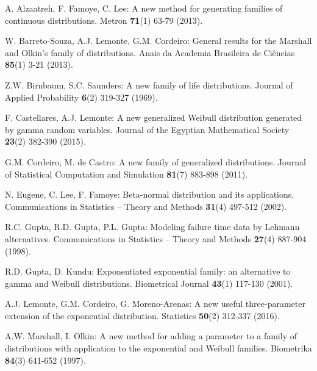 \documentclass[12pt,a4paper]{article} %
\begin{document}
\begin{description}

\item
A. Alzaatreh, F. Famoye, C. Lee:
A new method for generating families of continuous distributions.
Metron {\bf 71}(1) 63-79 (2013).

\item
W. Barreto-Souza, A.J. Lemonte, G.M. Cordeiro:
General results for the Marshall and Olkin's family of distributions.
Anais da Academia Brasileira de Ci\^{e}ncias {\bf 85}(1) 3-21 (2013).

\item
Z.W. Birnbaum, S.C. Saunders:
A new family of life distributions.
Journal of Applied Probability {\bf 6}(2) 319-327 (1969).

\item
F. Castellares, A.J. Lemonte:
A new generalized Weibull distribution gene\-rated by gamma random variables.
Journal of the Egyptian Mathematical Society {\bf 23}(2) 382-390 (2015).

\item
G.M. Cordeiro, M. de Castro:
A new family of generalized distributions.
Journal of Statistical Computation and Simulation {\bf 81}(7) 883-898 (2011).

\item
N. Eugene, C. Lee, F. Famoye:
Beta-normal distribution and its applications.
Communications in Statistics -- Theory and Methods {\bf 31}(4) 497-512 (2002).

\item
R.C. Gupta, R.D. Gupta, P.L. Gupta:
Modeling failure time data by Lehmann alternatives.
Communications in Statistics -- Theory and Methods {\bf 27}(4) 887-904 (1998).

\item
R.D. Gupta, D. Kundu:
Exponentiated exponential family: an alternative to gamma and Weibull distributions.
Biometrical Journal {\bf 43}(1) 117-130 (2001).


\item
A.J. Lemonte, G.M. Cordeiro, G. Moreno-Arenas:
A new useful three-parameter extension of the exponential distribution.
Statistics {\bf 50}(2) 312-337 (2016).

\item
A.W. Marshall, I. Olkin:
A new method for adding a parameter to a family of distributions with
application to the exponential and Weibull families.
Biometrika {\bf 84}(3) 641-652 (1997).


\end{description}
\end{document}
